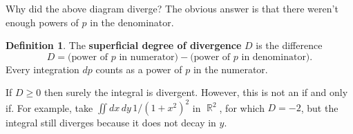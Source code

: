 \documentclass{report}
\theoremstyle{plain}
\theoremstyle{definition}
\newtheorem{definition}[theorem]{Definition}
\theoremstyle{remark}
\DeclareMathOperator{\bR}{\mathbb{R}}
\begin{document}
Why did the above diagram diverge? The obvious answer is that there
weren't enough powers of $p$ in the denominator.

\begin{definition}
  The {\bf superficial degree of divergence} $D$ is the difference
  $$ D = \text{(power of } p \text{ in numerator)} - \text{(power of } p \text{ in denominator)}. $$
  Every integration $dp$ counts as a power of $p$ in the numerator.
\end{definition}

If $D \ge 0$ then surely the integral is divergent. However, this is
not an if and only if. For example, take
$\iint dx \, dy \, 1/(1 + x^2)^2$ in $\bR^2$, for which $D = -2$, but
the integral still diverges because it does not decay in $y$.
\end{document}
